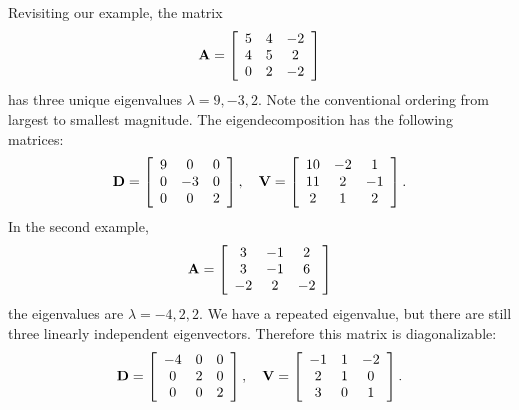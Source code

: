 Revisiting our example, the matrix
\begin{align}
  \mathbf{A} =
  \left[ \begin{array}{c c c}
   5 &  4 & -2 \\
   4 &  5 &  2 \\
   0 &  2 & -2 \\ \end{array} \right]  \nonumber
\end{align}
has three unique eigenvalues $\lambda = 9, -3, 2$. Note the conventional ordering from largest to smallest magnitude. The eigendecomposition has the following matrices:
\begin{align}
  \mathbf{D} =  \left[ \begin{array}{c c c}
  9				& 0				& 0			\\
  0				& -3			& 0			\\
  0				& 0				& 2			\\ \end{array} \right] , \quad
 \mathbf{V} =  \left[ \begin{array}{c c c}
  10			& -2			&  1			\\
  11			&  2			& -1			\\
  2				&  1			&  2			\\ \end{array} \right]  . \nonumber
\end{align}
In the second example, 
\begin{align}
  \mathbf{A} =
  \left[ \begin{array}{c c c}
   3 & -1 &  2 \\
   3 & -1 &  6 \\
  -2 &  2 & -2 \\ \end{array} \right] \nonumber
\end{align}
the eigenvalues are $\lambda = -4, 2, 2.$ We have a repeated eigenvalue, but there are still three linearly independent eigenvectors. Therefore this matrix is diagonalizable:
\begin{align}
  \mathbf{D} =  \left[ \begin{array}{c c c}
 -4				& 0				& 0			\\
  0				& 2				& 0			\\
  0				& 0				& 2			\\ \end{array} \right] , \quad
 \mathbf{V} =  \left[ \begin{array}{c c c}
  -1			&  1			& -2			\\
   2			&  1			&  0			\\
   3			&  0			&  1			\\ \end{array} \right]  . \nonumber
\end{align}
